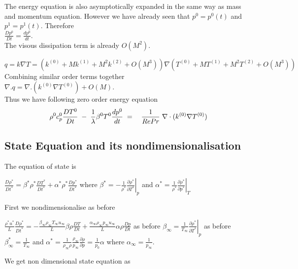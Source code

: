\documentclass[11pt,a4paper]{article}
\begin{document}
 The energy equation is also asymptotically expanded in the same way as mass and momentum equation. However we have already seen that $p^0=p^0(t)$ and $p^1=p^1(t)$. Therefore \\
 $\frac{Dp^0}{Dt}= \frac{dp^0}{dt}$. \\
 The visous dissipation term is already $O(M^2)$.
 
$q=k \nabla T = (k^{(0)}+Mk^{(1)}+M^2k^{(2)}+O(M^3)) \nabla (T^{(0)}+MT^{(1)}+M^2T^{(2)}+O(M^3))$ \\
Combining similar order terms together \\
$\nabla . q =  \nabla . (k^{(0)} \nabla T^{(0)}) + O(M)$. \\
Thus we have following zero order energy equation
\begin{eqnarray}
 \rho^0 c_p^0 \frac{D T^0}{D t}\hspace{1mm}-\hspace{1mm}\frac{1}{\lambda} \beta^0 T^0 \frac{d p^0}{d t} \hspace{1mm} &=& \hspace{1mm} \frac{1}{RePr} \hspace{1mm} \nabla \cdot (k^{(0)} \nabla T^{(0)})
\end{eqnarray}
\subsection{State Equation and its nondimensionalisation}

The equation of state is 

$\frac{D \rho^*}{D t^*}= \beta^* \rho^* \frac{D T^*}{D t^*} + \alpha^* \rho^* \frac{D p^*}{D t^*}$ where $\beta^* = -\frac{1}{\rho^*} \left.\frac{\partial \rho^*}{\partial T^*}\right|_p$ and $\alpha^*=\frac{1}{\rho^*}  \left. \frac{\partial \rho^*}{\partial p^*} \right|_T $

First we nondimensionalise as before 

$\frac{\rho^* u^*}{L}\frac{D \rho^*}{D t^*}=-\frac{\beta_\infty \rho_\infty T_\infty u_\infty}{L} \beta \rho \frac{D T}{D t} + \frac{\alpha_\infty \rho_\infty p_\infty u_\infty}{L} \alpha \rho \frac{D p}{D t}$ as before $\beta_\infty = \frac{1}{T_\infty} \left.\frac{\partial \rho^*}{\partial T^*}\right|_p$ as before $\beta_\infty^*=\frac{1}{T_\infty}$ and $\alpha^*= \frac{1}{\rho_\infty \rho} \frac{\rho_\infty}{p_\infty} \frac{\partial \rho}{\partial p} = \frac{1}{p_0} \alpha$ where $\alpha_\infty = \frac{1}{p_\infty}$. 

We get non dimensional state equation as
\end{document}
